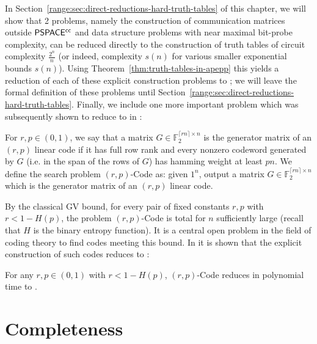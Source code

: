 In Section~\ref{range:sec:direct-reductions-hard-truth-tables} of this chapter, we will show that 2 problems, namely the construction of communication matrices outside $\cl{PSPACE^{cc}}$ and data structure problems with near maximal bit-probe complexity, can be reduced directly to the construction of truth tables of circuit complexity $\frac{2^n}{n}$ (or indeed, complexity $s(n)$ for various smaller exponential bounds $s(n)$). Using Theorem~\ref{thm:truth-tables-in-apepp} this yields a reduction of each of these explicit construction problems to \avoid; we will leave the formal definition of these problems until Section~\ref{range:sec:direct-reductions-hard-truth-tables}. Finally, we include one more important problem which was subsequently shown to reduce to \avoid in \cite{guruswami2022range}:
\begin{definition}[GV Codes]\label{range:def:gv-codes}
For $r, p \in (0,1)$, we say that a matrix $G \in \mathbb{F}_2^{\lceil rn  \rceil \times n}$ is the generator matrix of an $(r,p)$ linear code if it has full row rank and every nonzero codeword generated by $G$ (i.e. in the span of the rows of $G$) has hamming weight at least $pn$. We define the search problem {\sc $(r,p)$-Code} as: given $1^n$, output a matrix $G\in \mathbb{F}_2^{\lceil rn  \rceil \times n}$ which is the generator matrix of an $(r,p)$ linear code.
\end{definition}
By the classical GV bound, for every pair of fixed constants $r,p$ with $r < 1 - H(p)$, the problem  {\sc $(r,p)$-Code} is total for $n$ sufficiently large (recall that $H$ is the binary entropy function). It is a central open problem in the field of coding theory to find codes meeting this bound. In \cite{guruswami2022range} it is shown that the explicit construction of such codes reduces to \avoid:
\begin{theorem}
For any $r,p\in (0,1)$ with $r < 1 - H(p)$, {\sc $(r,p)$-Code} reduces in polynomial time to \avoid.
\end{theorem}
\section{Completeness}\label{range:sec:completeness}

